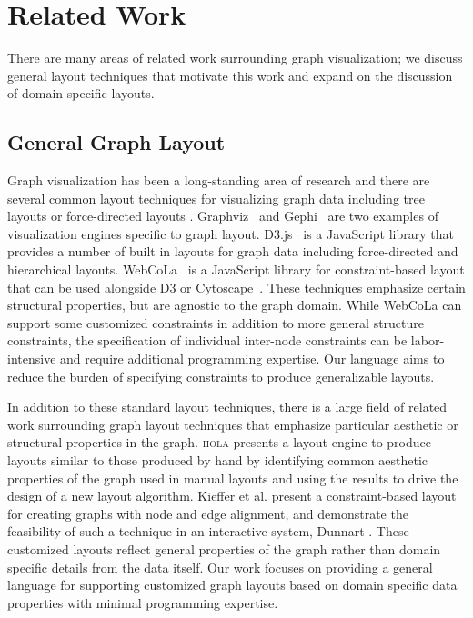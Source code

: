 \section{Related Work}
There are many areas of related work surrounding graph visualization; we discuss general layout techniques that motivate this work and expand on the discussion of domain specific layouts.

\subsection{General Graph Layout}
Graph visualization has been a long-standing area of research and there are several common layout techniques for visualizing graph data including tree layouts or force-directed layouts \cite{herman2000graph,eades2010graph}. Graphviz~\cite{ellson2001graphviz} and Gephi~\cite{bastian2009gephi} are two examples of visualization engines specific to graph layout. D3.js~\cite{bostock:d3} is a JavaScript library that provides a number of built in layouts for graph data including force-directed and hierarchical layouts. WebCoLa~\cite{WebCoLa} is a JavaScript library for constraint-based layout that can be used alongside D3 or Cytoscape~\cite{shannon2003cytoscape}. These techniques emphasize certain structural properties, but are agnostic to the graph domain. While WebCoLa can support some customized constraints in addition to more general structure constraints, the specification of individual inter-node constraints can be labor-intensive and require additional programming expertise. Our language aims to reduce the burden of specifying constraints to produce generalizable layouts. 

In addition to these standard layout techniques, there is a large field of related work surrounding graph layout techniques that emphasize particular aesthetic or structural properties in the graph. \textsc{hola} \cite{kieffer2016hola} presents a layout engine to produce layouts similar to those produced by hand by identifying common aesthetic properties of the graph used in manual layouts and using the results to drive the design of a new layout algorithm. Kieffer et al. \cite{kieffer2013incremental} present a constraint-based layout for creating graphs with node and edge alignment, and demonstrate the feasibility of such a technique in an interactive system, Dunnart \cite{dwyer2008dunnart}. These customized layouts reflect general properties of the graph rather than domain specific details from the data itself. Our work focuses on providing a general language for supporting customized graph layouts based on domain specific data properties with minimal programming expertise.

